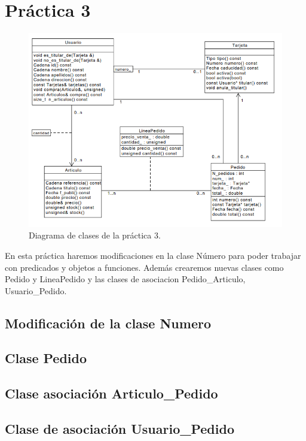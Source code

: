 \chapter{Práctica 3}
\begin{figure}[h]
  \begin{center}
    \includegraphics[width=\textwidth]{Pics/P3_1.png}
  \end{center}
  \caption{Diagrama de clases de la práctica 3.}
\end{figure}

En esta práctica haremos modificaciones en la clase Número para poder trabajar con predicados y objetos a funciones. Además crearemos nuevas clases como Pedido y LineaPedido y las clases de asociacion Pedido\_Articulo, Usuario\_Pedido.
\newpage
\section{Modificación de la clase Numero}
  
\newpage
\section{Clase Pedido}
  
\newpage

\section{Clase asociación Articulo\_Pedido}
  
\newpage
\section{Clase de asociación Usuario\_Pedido}
  
